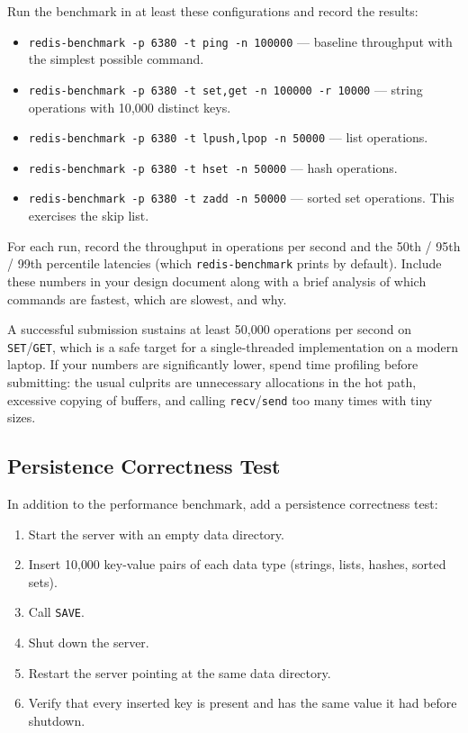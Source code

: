 \documentclass[11pt,a4paper]{article}
\begin{document}
Run the benchmark in at least these configurations and record the results:

\begin{itemize}
\item \texttt{redis-benchmark -p 6380 -t ping -n 100000} --- baseline throughput with the simplest possible command.
\item \texttt{redis-benchmark -p 6380 -t set,get -n 100000 -r 10000} --- string operations with 10{,}000 distinct keys.
\item \texttt{redis-benchmark -p 6380 -t lpush,lpop -n 50000} --- list operations.
\item \texttt{redis-benchmark -p 6380 -t hset -n 50000} --- hash operations.
\item \texttt{redis-benchmark -p 6380 -t zadd -n 50000} --- sorted set operations. This exercises the skip list.
\end{itemize}

For each run, record the throughput in operations per second and the 50th / 95th / 99th percentile latencies (which \texttt{redis-benchmark} prints by default). Include these numbers in your design document along with a brief analysis of which commands are fastest, which are slowest, and why.

A successful submission sustains at least 50{,}000 operations per second on \texttt{SET}/\texttt{GET}, which is a safe target for a single-threaded implementation on a modern laptop. If your numbers are significantly lower, spend time profiling before submitting: the usual culprits are unnecessary allocations in the hot path, excessive copying of buffers, and calling \texttt{recv}/\texttt{send} too many times with tiny sizes.

\subsection{Persistence Correctness Test}
In addition to the performance benchmark, add a persistence correctness test:

\begin{enumerate}
\item Start the server with an empty data directory.
\item Insert 10{,}000 key-value pairs of each data type (strings, lists, hashes, sorted sets).
\item Call \texttt{SAVE}.
\item Shut down the server.
\item Restart the server pointing at the same data directory.
\item Verify that every inserted key is present and has the same value it had before shutdown.
\end{enumerate}
\end{document}
